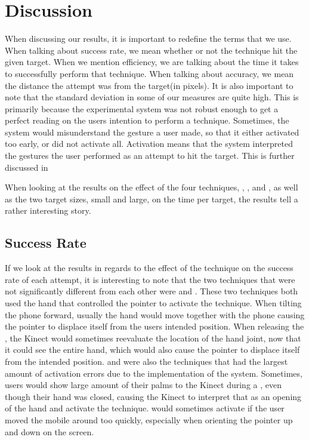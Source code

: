 \section{Discussion}
\label{sec:discussion}
When discussing our results, it is important to redefine the terms that we use.
When talking about success rate, we mean whether or not the technique hit the given target.
When we mention efficiency, we are talking about the time it takes to successfully perform that technique.
When talking about accuracy, we mean the distance the attempt was from the target(in pixels).
It is also important to note that the standard deviation in some of our measures are quite high.
This is primarily because the experimental system was not robust enough to get a perfect reading on the users intention to perform a technique.
Sometimes, the system would misunderstand the gesture a user made, so that it either activated too early, or did not activate all. 
Activation means that the system interpreted the gestures the user performed as an attempt to hit the target.
This is further discussed in 

When looking at the results on the effect of the four techniques, \pinch, \swipe, \throw and \tilt, as well as the two target sizes, small and large, on the time per target, the results tell a rather interesting story. 

\subsection{Success Rate}
If we look at the results in regards to the effect of the technique on the success rate of each attempt, it is interesting to note that the two techniques that were not significantly different from each other were \tilt and \pinch. These two techniques both used the hand that controlled the pointer to activate the technique. When tilting the phone forward, usually the hand would move together with the phone causing the pointer to displace itself from the users intended position. When releasing the \pinch, the Kinect would sometimes reevaluate the location of the hand joint, now that it could see the entire hand, which would also cause the pointer to displace itself from the intended position. \pinch and \tilt were also the techniques that had the largest amount of activation errors due to the implementation of the system.
Sometimes, users would show large amount of their palms to the Kinect during a \pinch, even though their hand was closed, causing the Kinect to interpret that as an opening of the hand and activate the technique. \tilt would sometimes activate if the user moved the mobile around too quickly, especially when orienting the pointer up and down on the screen.  

